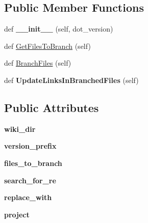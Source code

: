\subsection*{Public Member Functions}
\begin{DoxyCompactItemize}
\item 
def {\bfseries \+\_\+\+\_\+init\+\_\+\+\_\+} (self, dot\+\_\+version)\hypertarget{classrelease__docs_1_1WikiBrancher_a344b32e2b65f0e8bab9fbf1e670d33fd}{}\label{classrelease__docs_1_1WikiBrancher_a344b32e2b65f0e8bab9fbf1e670d33fd}

\item 
def \hyperlink{classrelease__docs_1_1WikiBrancher_a05fc4282f501fb0210ecb33fd1d209a6}{Get\+Files\+To\+Branch} (self)
\item 
def \hyperlink{classrelease__docs_1_1WikiBrancher_a5ef284f7e1742f465ecd0c14d2667327}{Branch\+Files} (self)
\item 
def {\bfseries Update\+Links\+In\+Branched\+Files} (self)\hypertarget{classrelease__docs_1_1WikiBrancher_aa0bc4b1b78426fe7a8496d570b540f1d}{}\label{classrelease__docs_1_1WikiBrancher_aa0bc4b1b78426fe7a8496d570b540f1d}

\end{DoxyCompactItemize}
\subsection*{Public Attributes}
\begin{DoxyCompactItemize}
\item 
{\bfseries wiki\+\_\+dir}\hypertarget{classrelease__docs_1_1WikiBrancher_ad86478c9538ac0bf3916f67eb5da2910}{}\label{classrelease__docs_1_1WikiBrancher_ad86478c9538ac0bf3916f67eb5da2910}

\item 
{\bfseries version\+\_\+prefix}\hypertarget{classrelease__docs_1_1WikiBrancher_aae330aeef850b105795c5d75727448ba}{}\label{classrelease__docs_1_1WikiBrancher_aae330aeef850b105795c5d75727448ba}

\item 
{\bfseries files\+\_\+to\+\_\+branch}\hypertarget{classrelease__docs_1_1WikiBrancher_a938c78ba6e8adfb6af039dd500ac6466}{}\label{classrelease__docs_1_1WikiBrancher_a938c78ba6e8adfb6af039dd500ac6466}

\item 
{\bfseries search\+\_\+for\+\_\+re}\hypertarget{classrelease__docs_1_1WikiBrancher_a029ce9007fefd6ac5f13bacdedb29af5}{}\label{classrelease__docs_1_1WikiBrancher_a029ce9007fefd6ac5f13bacdedb29af5}

\item 
{\bfseries replace\+\_\+with}\hypertarget{classrelease__docs_1_1WikiBrancher_aa33d991e629cc94fbfefe4f8569e283e}{}\label{classrelease__docs_1_1WikiBrancher_aa33d991e629cc94fbfefe4f8569e283e}

\item 
{\bfseries project}\hypertarget{classrelease__docs_1_1WikiBrancher_a4ac9c796f95690cca04049b557055443}{}\label{classrelease__docs_1_1WikiBrancher_a4ac9c796f95690cca04049b557055443}

\end{DoxyCompactItemize}


